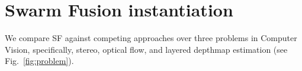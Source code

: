 \section{Swarm Fusion instantiation}

We compare SF against competing approaches over three problems in
Computer Vision, specifically, stereo, optical flow, and layered
depthmap estimation (see Fig.~\ref{fig:problem}).



